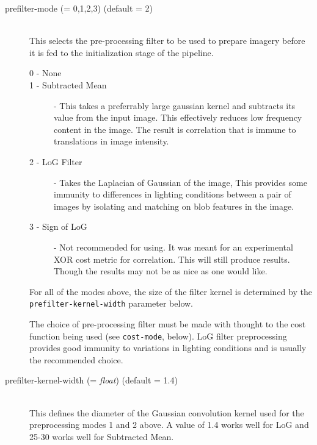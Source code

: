 \begin{description}

\item[prefilter-mode \textnormal{\small{(= 0,1,2,3)}} (default = 2)] \hfill \\
  This selects the pre-processing filter to be used to prepare imagery
  before it is fed to the initialization stage of the pipeline.

  \begin{description}
    \item[0 - None]
    \item[1 - Subtracted Mean] - This takes a preferrably large
      gaussian kernel and subtracts its value from the input
      image. This effectively reduces low frequency content in the
      image. The result is correlation that is immune to translations
      in image intensity.
    \item[2 - LoG Filter] - Takes the Laplacian of Gaussian of the
      image, This provides some immunity to differences in lighting
      conditions between a pair of images by isolating and matching on
      blob features in the image.
    \item[3 - Sign of LoG] - Not recommended for using. It was meant
      for an experimental XOR cost metric for correlation. This will
      still produce results. Though the results may not be as nice as
      one would like.
  \end{description}

  For all of the modes above, the size of the filter kernel is
  determined by the \texttt{prefilter-kernel-width} parameter below.

  The choice of pre-processing filter must be made with thought to the
  cost function being used (see \texttt{cost-mode}, below).  LoG filter
  preprocessing provides good immunity to variations in lighting
  conditions and is usually the recommended choice.

\item[prefilter-kernel-width \textnormal{\small{(= \emph{float})}} (default = 1.4)] \hfill \\
  This defines the diameter of the Gaussian convolution kernel used
  for the preprocessing modes 1 and 2 above. A value of 1.4 works
  well for LoG and 25-30 works well for Subtracted Mean.


\end{description}
